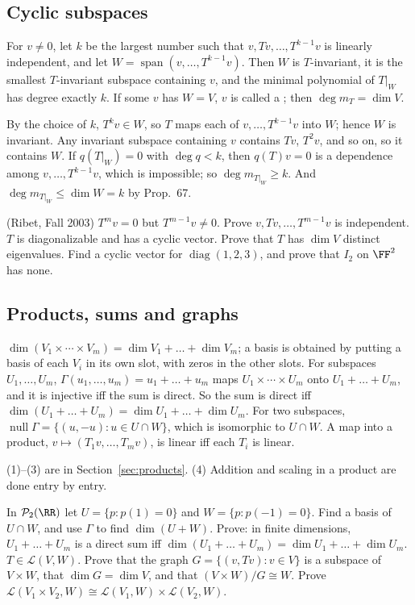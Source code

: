 \documentclass[10pt]{scrartcl}
\DeclareMathOperator{\nul}{null}
\DeclareMathOperator{\spn}{span}
\newcommand{\LL}{\mathcal L}
\newcommand{\PP}{\mathcal P}
\begin{document}
\subsection{Cyclic subspaces}\label{sec:T6}
\begin{theorem*}[T6]
  For $v\ne0$, let $k$ be the largest number such that $v,Tv,\dots,T^{k-1}v$ is linearly independent, and let $W=\spn(v,\dots,T^{k-1}v)$. Then $W$ is $T$-invariant, it is the smallest $T$-invariant subspace containing $v$, and the minimal polynomial of $T|_W$ has degree exactly $k$.
  If some $v$ has $W=V$, $v$ is called a ; then $\deg m_T=\dim V$.
\end{theorem*}
\why By the choice of $k$, $T^kv\in W$, so $T$ maps each of $v,\dots,T^{k-1}v$ into $W$; hence $W$ is invariant. Any invariant subspace containing $v$ contains $Tv$, $T^2v$, and so on, so it contains $W$. If $q(T|_W)=0$ with $\deg q<k$, then $q(T)v=0$ is a dependence among $v,\dots,T^{k-1}v$, which is impossible; so $\deg m_{T|_W}\ge k$. And $\deg m_{T|_W}\le\dim W=k$ by Prop.~67.
\probs
\begin{enumerate}[(a)]
  \ii (Ribet, Fall 2003) $T^mv=0$ but $T^{m-1}v\ne0$. Prove $v,Tv,\dots,T^{m-1}v$ is independent.
  \ii $T$ is diagonalizable and has a cyclic vector. Prove that $T$ has $\dim V$ distinct eigenvalues.
  \ii Find a cyclic vector for $\operatorname{diag}(1,2,3)$, and prove that $I_2$ on $\FF^2$ has none.
\end{enumerate}

\subsection{Products, sums and graphs}
\begin{theorem*}[T7]
  \begin{enumerate}
    \ii $\dim(V_1\times\cdots\times V_m)=\dim V_1+\dots+\dim V_m$; a basis is obtained by putting a basis of each $V_i$ in its own slot, with zeros in the other slots.
    \ii For subspaces $U_1,\dots,U_m$, $\Gamma(u_1,\dots,u_m)=u_1+\dots+u_m$ maps $U_1\times\cdots\times U_m$ onto $U_1+\dots+U_m$, and it is injective iff the sum is direct. So the sum is direct iff $\dim(U_1+\dots+U_m)=\dim U_1+\dots+\dim U_m$.
    \ii For two subspaces, $\nul\Gamma=\{(u,-u):u\in U\cap W\}$, which is isomorphic to $U\cap W$.
    \ii A map into a product, $v\mapsto(T_1v,\dots,T_mv)$, is linear iff each $T_i$ is linear.
  \end{enumerate}
\end{theorem*}
\why (1)--(3) are in Section~\ref{sec:products}. (4) Addition and scaling in a product are done entry by entry.
\probs
\begin{enumerate}[(a)]
  \ii In $\PP_2(\RR)$ let $U=\{p:p(1)=0\}$ and $W=\{p:p(-1)=0\}$. Find a basis of $U\cap W$, and use $\Gamma$ to find $\dim(U+W)$.
  \ii Prove: in finite dimensions, $U_1+\dots+U_m$ is a direct sum iff $\dim(U_1+\dots+U_m)=\dim U_1+\dots+\dim U_m$.
  \ii $T\in\LL(V,W)$. Prove that the graph $G=\{(v,Tv):v\in V\}$ is a subspace of $V\times W$, that $\dim G=\dim V$, and that $(V\times W)/G\cong W$.
  \ii Prove $\LL(V_1\times V_2,W)\cong\LL(V_1,W)\times\LL(V_2,W)$.
\end{enumerate}
\end{document}
